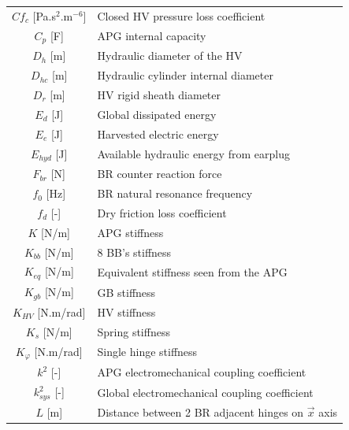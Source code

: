 \documentclass[3p,twocolumn,preprint]{elsarticle}
\begin{document}
\begin{table}
\begin{minipage}{.5\textwidth}
\begin{tabular}{ c  m{6cm} }
		$Cf_c$ [Pa.s$^2$.m$^{-6}$]       & Closed HV pressure loss coefficient                     \\
		$C_p$ [F]                & APG internal capacity                                   \\
		$D_h$ [m]                & Hydraulic diameter of the HV                            \\
		$D_{hc}$ [m]             & Hydraulic cylinder internal diameter                    \\
		$D_r$ [m]                & HV rigid sheath diameter                                \\
		$E_d$ [J]                & Global dissipated energy                                \\
		$E_e$ [J]                & Harvested electric energy                               \\
		$E_{hyd}$ [J]            & Available hydraulic energy from earplug                 \\
		$F_{br}$ [N]             & BR counter reaction force                               \\
		$f_0$ [Hz]				 &	BR natural resonance frequency						   \\
		$f_d$ [-]                & Dry friction loss coefficient                           \\
		$K$ [N/m]                & APG stiffness                                           \\
		$K_{bb}$ [N/m]           & 8 BB's stiffness                                        \\
		$K_{eq}$ [N/m]           & Equivalent stiffness seen from the APG                  \\
		$K_{gb}$ [N/m]           & GB stiffness                                            \\
		$K_{HV}$ [N.m/rad]        & HV stiffness                                            \\
		$K_s$ [N/m]              & Spring stiffness                                        \\
		$K_{\varphi}$ [N.m/rad]   & Single hinge stiffness                                  \\
		$k^2$ [-]                & APG electromechanical coupling coefficient              \\
		$k_{sys}^2$ [-]          & Global electromechanical coupling coefficient           \\
		$L$ [m]                  & Distance between 2 BR adjacent hinges on $\vec{x}$ axis \\

\end{tabular}
\end{minipage}
\end{table}
\end{document}

